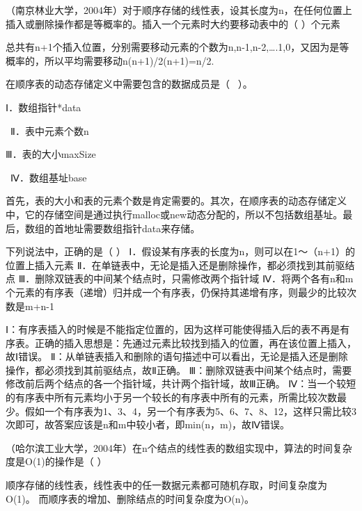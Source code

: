 \question （南京林业大学，2004年）对于顺序存储的线性表，设其长度为n，在任何位置上插入或删除操作都是等概率的。插入一个元素时大约要移动表中的（
）个元素
\par{}
\begin{solution}总共有n+1个插入位置，分别需要移动元素的个数为n,n-1,n-2,\ldots{}.1,0，又因为是等概率的，所以平均需要移动n(n+1)/2(n+1)=n/2.
\end{solution}
\question 在顺序表的动态存储定义中需要包含的数据成员是（ ~）。~

Ⅰ．数组指针*data

~Ⅱ．表中元素个数n~

Ⅲ．表的大小maxSize

~Ⅳ．数组基址base
\par{}
\begin{solution}首先，表的大小和表的元素个数是肯定需要的。其次，在顺序表的动态存储定义中，它的存储空间是通过执行malloc或new动态分配的，所以不包括数组基址。最后，数组的首地址需要数组指针data来存储。
\end{solution}
\question 下列说法中，正确的是（ ）
Ⅰ．假设某有序表的长度为n，则可以在1～（n+1）的位置上插入元素
Ⅱ．在单链表中，无论是插入还是删除操作，都必须找到其前驱结点
Ⅲ．删除双链表的中间某个结点时，只需修改两个指针域
Ⅳ．将两个各有n和m个元素的有序表（递增）归并成一个有序表，仍保持其递增有序，则最少的比较次数是m+n-1
\par{}
\begin{solution}Ⅰ：有序表插入的时候是不能指定位置的，因为这样可能使得插入后的表不再是有序表。正确的插入思想是：先通过元素比较找到插入的位置，再在该位置上插入，故Ⅰ错误。
Ⅱ：从单链表插入和删除的语句描述中可以看出，无论是插入还是删除操作，都必须找到其前驱结点，故Ⅱ正确。
Ⅲ：删除双链表中间某个结点时，需要修改前后两个结点的各一个指针域，共计两个指针域，故Ⅲ正确。
Ⅳ：当一个较短的有序表中所有元素均小于另一个较长的有序表中所有的元素，所需比较次数最少。假如一个有序表为1、3、4，另一个有序表为5、6、7、8、12，这样只需比较3次即可，故答案应该是n和m中较小者，即min(n，m)，故Ⅳ错误。
\end{solution}
\question （哈尔滨工业大学，2004年）在n个结点的线性表的数组实现中，算法的时间复杂度是O(1)的操作是（
）
\par{}
\begin{solution}顺序存储的线性表，线性表中的任一数据元素都可随机存取，时间复杂度为O(1)。
而顺序表的增加、删除结点的时间复杂度为O(n)。
\end{solution}
